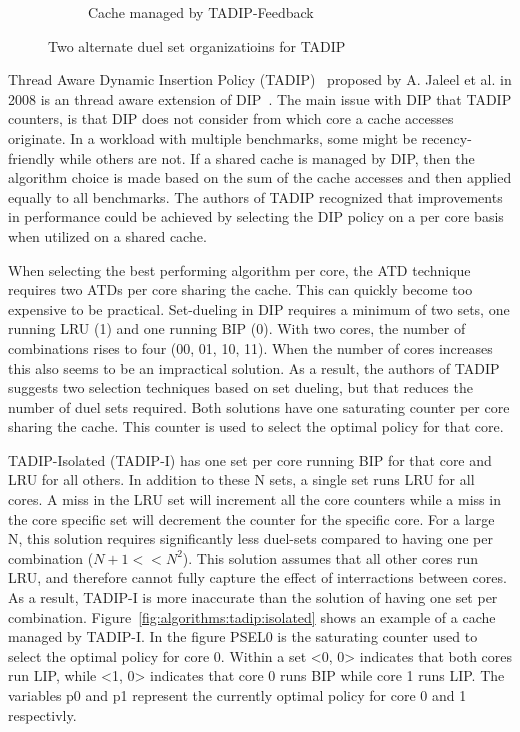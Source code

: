 \begin{figure}[H]
\begin{subfigure}[b]{0.5\textwidth}
        \caption{Cache managed by TADIP-Feedback}
        \label{fig:algorithms:tadip:feedback}
    \end{subfigure}    
    \caption{Two alternate duel set organizatioins for TADIP}
    \label{fig:algorithms:tadip}
\end{figure}

Thread Aware Dynamic Insertion Policy (TADIP)~\cite{Jaleel2008} proposed by A. Jaleel et al. in 2008 is an thread aware extension of DIP~\cite{Qureshi2007}.
The main issue with DIP that TADIP counters, is that DIP does not consider from which core a cache accesses originate.
In a workload with multiple benchmarks, some might be recency-friendly while others are not. 
If a shared cache is managed by DIP, then the algorithm choice is made based on the sum of the cache accesses and then applied equally to all benchmarks.
The authors of TADIP recognized that improvements in performance could be achieved by selecting the DIP policy on a per core basis when utilized on a shared cache.

When selecting the best performing algorithm per core, the ATD technique requires two ATDs per core sharing the cache. 
This can quickly become too expensive to be practical.
Set-dueling in DIP requires a minimum of two sets, one running LRU (1) and one running BIP (0). 
With two cores, the number of combinations rises to four (00, 01, 10, 11).
When the number of cores increases this also seems to be an impractical solution.
As a result, the authors of TADIP suggests two selection techniques based on set dueling, but that reduces the number of duel sets required.
Both solutions have one saturating counter per core sharing the cache.
This counter is used to select the optimal policy for that core.

TADIP-Isolated (TADIP-I) has one set per core running BIP for that core and LRU for all others.
In addition to these N sets, a single set runs LRU for all cores. 
A miss in the LRU set will increment all the core counters while a miss in the core specific set will decrement the counter for the specific core.
For a large N, this solution requires significantly less duel-sets compared to having one per combination ($N+1 << N^2$). 
This solution assumes that all other cores run LRU, and therefore cannot fully capture the effect of interractions between cores.
As a result, TADIP-I is more inaccurate than the solution of having one set per combination.
Figure~\ref{fig:algorithms:tadip:isolated} shows an example of a cache managed by TADIP-I. 
In the figure PSEL0 is the saturating counter used to select the optimal policy for core 0.
Within a set <0, 0> indicates that both cores run LIP, while <1, 0> indicates that core 0 runs BIP while core 1 runs LIP.
The variables p0 and p1 represent the currently optimal policy for core 0 and 1 respectivly.

